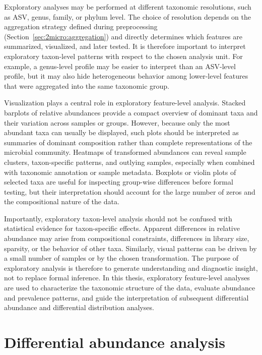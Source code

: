 Exploratory analyses may be performed at different taxonomic resolutions, such as ASV, genus, family, or phylum level. The choice of resolution depends on the aggregation strategy defined during preprocessing (Section~\ref{sec:2micro:aggregation}) and directly determines which features are summarized, visualized, and later tested. It is therefore important to interpret exploratory taxon-level patterns with respect to the chosen analysis unit. For example, a genus-level profile may be easier to interpret than an ASV-level profile, but it may also hide heterogeneous behavior among lower-level features that were aggregated into the same taxonomic group.

Visualization plays a central role in exploratory feature-level analysis. Stacked barplots of relative abundances provide a compact overview of dominant taxa and their variation across samples or groups. However, because only the most abundant taxa can usually be displayed, such plots should be interpreted as summaries of dominant composition rather than complete representations of the microbial community. Heatmaps of transformed abundances can reveal sample clusters, taxon-specific patterns, and outlying samples, especially when combined with taxonomic annotation or sample metadata. Boxplots or violin plots of selected taxa are useful for inspecting group-wise differences before formal testing, but their interpretation should account for the large number of zeros and the compositional nature of the data.

Importantly, exploratory taxon-level analysis should not be confused with statistical evidence for taxon-specific effects. Apparent differences in relative abundance may arise from compositional constraints, differences in library size, sparsity, or the behavior of other taxa. Similarly, visual patterns can be driven by a small number of samples or by the chosen transformation. The purpose of exploratory analysis is therefore to generate understanding and diagnostic insight, not to replace formal inference. In this thesis, exploratory feature-level analyses are used to characterize the taxonomic structure of the data, evaluate abundance and prevalence patterns, and guide the interpretation of subsequent differential abundance and differential distribution analyses.

\section{Differential abundance analysis}
\label{sec:4feature:diffabund}

